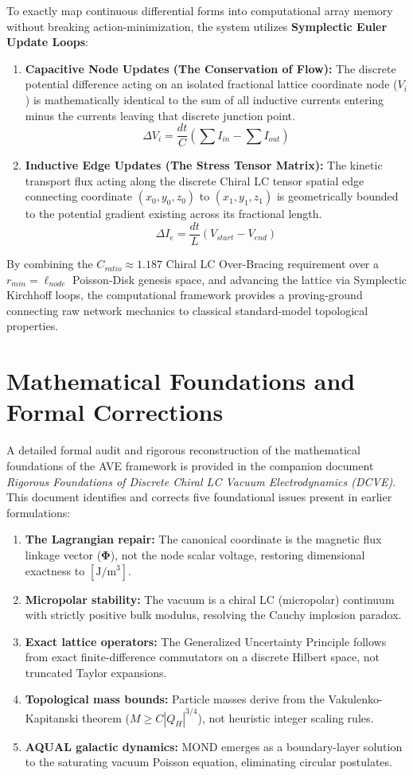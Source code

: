 To exactly map continuous differential forms into computational array memory without breaking action-minimization, the system utilizes \textbf{Symplectic Euler Update Loops}:
\begin{enumerate}
    \item \textbf{Capacitive Node Updates (The Conservation of Flow):} The discrete potential difference acting on an isolated fractional lattice coordinate node ($V_i$) is mathematically identical to the sum of all inductive currents entering minus the currents leaving that discrete junction point. 
    \[ \Delta V_i = \frac{dt}{C} \left( \sum I_{in} - \sum I_{out} \right) \]
    \item \textbf{Inductive Edge Updates (The Stress Tensor Matrix):} The kinetic transport flux acting along the discrete Chiral LC tensor spatial edge connecting coordinate $(x_0, y_0, z_0)$ to $(x_1, y_1, z_1)$ is geometrically bounded to the potential gradient existing across its fractional length. 
    \[ \Delta I_e = \frac{dt}{L} \left( V_{start} - V_{end} \right) \] 
\end{enumerate}

By combining the $C_{ratio} \approx 1.187$ Chiral LC Over-Bracing requirement over a $r_{min} = \ell_{node}$ Poisson-Disk genesis space, and advancing the lattice via Symplectic Kirchhoff loops, the computational framework provides a proving-ground connecting raw network mechanics to classical standard-model topological properties.

\chapter{Mathematical Foundations and Formal Corrections}
\label{app:mathematical_foundations}

A detailed formal audit and rigorous reconstruction of the mathematical foundations of the AVE framework is provided in the companion document \textit{Rigorous Foundations of Discrete Chiral LC Vacuum Electrodynamics (DCVE)}. This document identifies and corrects five foundational issues present in earlier formulations:
\begin{enumerate}
    \item \textbf{The Lagrangian repair:} The canonical coordinate is the magnetic flux linkage vector ($\mathbf{\Phi}$), not the node scalar voltage, restoring dimensional exactness to $[\text{J}/\text{m}^3]$.
    \item \textbf{Micropolar stability:} The vacuum is a chiral LC (micropolar) continuum with strictly positive bulk modulus, resolving the Cauchy implosion paradox.
    \item \textbf{Exact lattice operators:} The Generalized Uncertainty Principle follows from exact finite-difference commutators on a discrete Hilbert space, not truncated Taylor expansions.
    \item \textbf{Topological mass bounds:} Particle masses derive from the Vakulenko-Kapitanski theorem ($M \geq C|Q_H|^{3/4}$), not heuristic integer scaling rules.
    \item \textbf{AQUAL galactic dynamics:} MOND emerges as a boundary-layer solution to the saturating vacuum Poisson equation, eliminating circular postulates.
\end{enumerate}